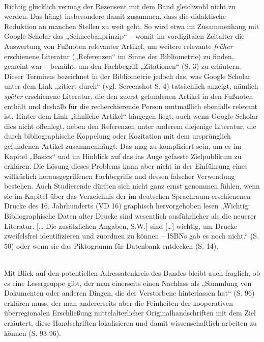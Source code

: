 \documentclass[a4paper,
fontsize=11pt,
oneside,
numbers=noperiodatend,
parskip=half-,
bibliography=totoc,
final
]{scrartcl}
\begin{document}
\\ Richtig glücklich vermag der Rezensent mit dem Band gleichwohl nicht
zu werden. Das hängt insbesondere damit zusammen, dass die didaktische
Reduktion an manchen Stellen zu weit geht. So wird etwa im Zusammenhang
mit Google Scholar das „Schneeballprinzip`` -- womit im vordigitalen
Zeitalter die Auswertung von Fußnoten relevanter Artikel, um weitere
relevante \emph{früher} erschienene Literatur („Referenzen`` im Sinne
der Bibliometrie) zu finden, gemeint war -- bemüht, um den Fachbegriff
„Zitationen`` (S. 3) zu erläutern. Dieser Terminus bezeichnet in der
Bibliometrie jedoch das, was Google Scholar unter dem Link „zitiert
durch`` (vgl. Screenshot S. 4) tatsächlich anzeigt, nämlich
\emph{später} erschienene Literatur, die den zuerst gefundenen Artikel
in den Fußnoten enthält und deshalb für die recherchierende Person
mutmaßlich ebenfalls relevant ist. Hinter dem Link „ähnliche Artikel``
hingegen liegt, auch wenn Google Scholar dies nicht offenlegt, neben den
Referenzen unter anderem diejenige Literatur, die durch bibliographische
Koppelung oder Kozitation mit dem ursprünglich gefundenen Artikel
zusammenhängt. Das mag zu kompliziert sein, um es im Kapitel „Basics``
und im Hinblick auf das ins Auge gefasste Zielpublikum zu erklären. Die
Lösung dieses Problems kann aber nicht in der Einführung eines
willkürlich herausgegriffenen Fachbegriffs und dessen falscher
Verwendung bestehen. Auch Studierende dürften sich nicht ganz ernst
genommen fühlen, wenn sie im Kapitel über das Verzeichnis der im
deutschen Sprachraum erschienenen Drucke des 16. Jahrhunderts (VD 16)
graphisch hervorgehoben lesen „Wichtig: Bibliographische Daten alter
Drucke sind wesentlich ausführlicher als die neuerer Literatur.
{[}\ldots{} Die zusätzlichen Angaben, S.W.{]} sind {[}\ldots{}{]}
wichtig, um Drucke zweifelsfrei identifizieren und zuordnen zu können --
ISBNs gab es noch nicht.`` (S. 50) oder wenn sie das Piktogramm für
Datenbank entdecken (S. 14).

\\ Mit Blick auf den potentiellen Adressatenkreis des Bandes bleibt auch
fraglich, ob es eine Lesergruppe gibt, der man einerseits einen Nachlass
als „Sammlung von Dokumenten oder anderen Dingen, die der Verstorbene
hinterlassen hat`` (S. 96) erklären muss, der man andererseits aber die
Feinheiten der kooperativen überregionalen Erschließung
mittelalterlicher Originalhandschriften mit dem Ziel erläutert, diese
Handschriften lokalisieren und damit wissenschaftlich arbeiten zu können
(S. 93-96).
\end{document}
